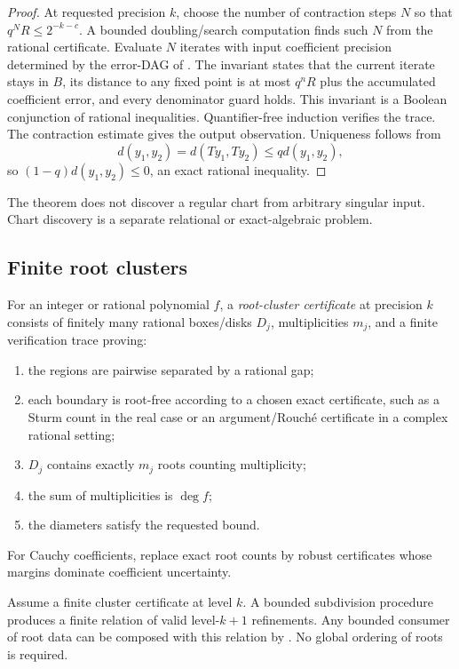 \begin{proof}
At requested precision $k$, choose the number of contraction steps $N$ so that $q^N R\le2^{-k-c}$.  A bounded doubling/search computation finds such $N$ from the rational certificate.  Evaluate $N$ iterates with input coefficient precision determined by the error-DAG of .  The invariant states that the current iterate stays in $B$, its distance to any fixed point is at most $q^nR$ plus the accumulated coefficient error, and every denominator guard holds.  This invariant is a Boolean conjunction of rational inequalities.  Quantifier-free induction verifies the trace.  The contraction estimate gives the output observation.  Uniqueness follows from
\[
 d(y_1,y_2)=d(Ty_1,Ty_2)\le qd(y_1,y_2),
\]
so $(1-q)d(y_1,y_2)\le0$, an exact rational inequality.
\end{proof}

The theorem does not discover a regular chart from arbitrary singular input.  Chart discovery is a separate relational or exact-algebraic problem.

\subsection{Finite root clusters}

For an integer or rational polynomial $f$, a \emph{root-cluster certificate} at precision $k$ consists of finitely many rational boxes/disks $D_j$, multiplicities $m_j$, and a finite verification trace proving:
\begin{enumerate}[label=(\alph*)]
\item the regions are pairwise separated by a rational gap;
\item each boundary is root-free according to a chosen exact certificate, such as a Sturm count in the real case or an argument/Rouch\'e certificate in a complex rational setting;
\item $D_j$ contains exactly $m_j$ roots counting multiplicity;
\item the sum of multiplicities is $\deg f$;
\item the diameters satisfy the requested bound.
\end{enumerate}
For Cauchy coefficients, replace exact root counts by robust certificates whose margins dominate coefficient uncertainty.

\begin{theorem}
\label{thm:cluster-refine}
Assume a finite cluster certificate at level $k$.  A bounded subdivision procedure produces a finite relation of valid level-$k+1$ refinements.  Any bounded consumer of root data can be composed with this relation by .  No global ordering of roots is required.
\end{theorem}

